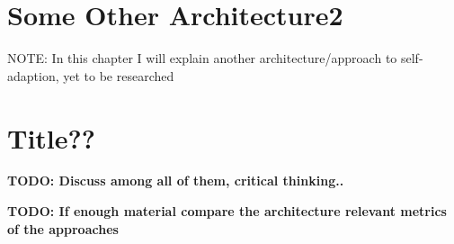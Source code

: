     \section{Some Other Architecture2}
    \label{sec:soa2}
    NOTE: In this chapter I will explain another architecture/approach to self-adaption, yet to be researched


    \section{Title??}
    \textbf{TODO: Discuss among all of them, critical thinking..}

    \textbf{TODO: If enough material compare the architecture relevant metrics of the approaches}